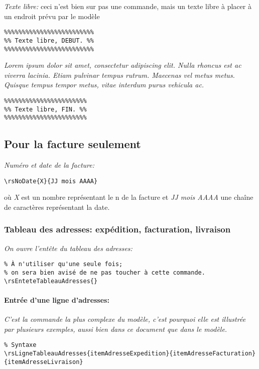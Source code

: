 \documentclass[a4paper,10pt]{article}
\begin{document}
\emph{Texte libre:}
ceci n'est bien sur pas une commande, mais un texte libre à placer à un endroit prévu par le modèle
\begin{lstlisting}
%%%%%%%%%%%%%%%%%%%%%%%%%
%% Texte libre, DEBUT. %%
%%%%%%%%%%%%%%%%%%%%%%%%%
\end{lstlisting}

\textit{Lorem ipsum dolor sit amet, consectetur adipiscing elit. Nulla rhoncus est ac viverra lacinia. Etiam pulvinar tempus rutrum. Maecenas vel metus metus. Quisque tempus tempor metus, vitae interdum purus vehicula ac.}

\begin{lstlisting}
%%%%%%%%%%%%%%%%%%%%%%%
%% Texte libre, FIN. %%
%%%%%%%%%%%%%%%%%%%%%%%
\end{lstlisting}


\subsection{Pour la facture seulement}

\emph{Numéro et date de la facture:}
\begin{lstlisting}
\rsNoDate{X}{JJ mois AAAA}
\end{lstlisting}
où \emph{X} est un nombre représentant le n de la facture et \emph{JJ mois AAAA} une chaîne de caractères représentant la date.

\subsubsection{Tableau des adresses: expédition, facturation, livraison}

\emph{On ouvre l'entête du tableau des adresses:}
\begin{lstlisting}
% À n'utiliser qu'une seule fois; 
% on sera bien avisé de ne pas toucher à cette commande.
\rsEnteteTableauAdresses{}
\end{lstlisting}

\paragraph{Entrée d'une ligne d'adresses:} \emph{C'est la commande la plus complexe du modèle, c'est pourquoi elle est illustrée par plusieurs exemples, aussi bien dans ce document que dans le modèle.}

\begin{lstlisting}
% Syntaxe
\rsLigneTableauAdresses{itemAdresseExpedition}{itemAdresseFacturation}{itemAdresseLivraison}
\end{lstlisting}
\end{document}
